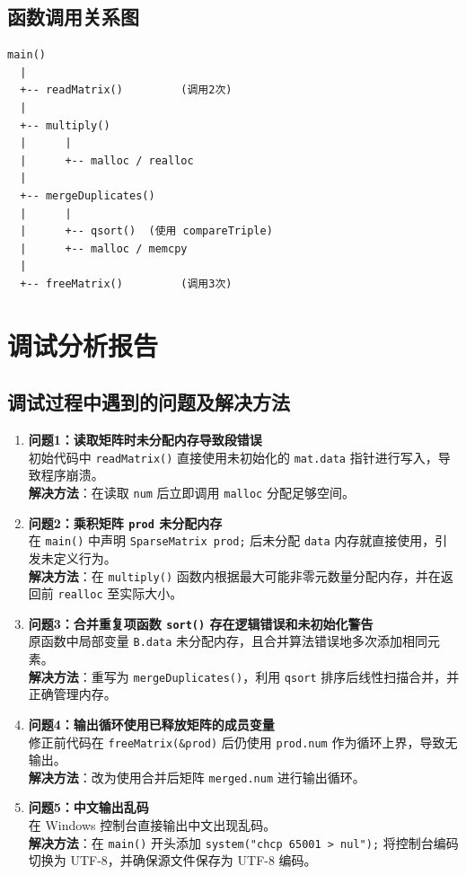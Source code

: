 \documentclass[UTF8]{ctexart}
\begin{document}
\subsection{函数调用关系图}
\begin{verbatim}
main()
  |
  +-- readMatrix()         (调用2次)
  |
  +-- multiply()
  |      |
  |      +-- malloc / realloc
  |
  +-- mergeDuplicates()
  |      |
  |      +-- qsort()  (使用 compareTriple)
  |      +-- malloc / memcpy
  |
  +-- freeMatrix()         (调用3次)
\end{verbatim}

\section{调试分析报告}

\subsection{调试过程中遇到的问题及解决方法}
\begin{enumerate}
    \item \textbf{问题1：读取矩阵时未分配内存导致段错误} \\
    初始代码中 \texttt{readMatrix()} 直接使用未初始化的 \texttt{mat.data} 指针进行写入，导致程序崩溃。\\
    \textbf{解决方法}：在读取 \texttt{num} 后立即调用 \texttt{malloc} 分配足够空间。

    \item \textbf{问题2：乘积矩阵 \texttt{prod} 未分配内存} \\
    在 \texttt{main()} 中声明 \texttt{SparseMatrix prod;} 后未分配 \texttt{data} 内存就直接使用，引发未定义行为。\\
    \textbf{解决方法}：在 \texttt{multiply()} 函数内根据最大可能非零元数量分配内存，并在返回前 \texttt{realloc} 至实际大小。

    \item \textbf{问题3：合并重复项函数 \texttt{sort()} 存在逻辑错误和未初始化警告} \\
    原函数中局部变量 \texttt{B.data} 未分配内存，且合并算法错误地多次添加相同元素。\\
    \textbf{解决方法}：重写为 \texttt{mergeDuplicates()}，利用 \texttt{qsort} 排序后线性扫描合并，并正确管理内存。

    \item \textbf{问题4：输出循环使用已释放矩阵的成员变量} \\
    修正前代码在 \texttt{freeMatrix(\&prod)} 后仍使用 \texttt{prod.num} 作为循环上界，导致无输出。\\
    \textbf{解决方法}：改为使用合并后矩阵 \texttt{merged.num} 进行输出循环。

    \item \textbf{问题5：中文输出乱码} \\
    在 Windows 控制台直接输出中文出现乱码。\\
    \textbf{解决方法}：在 \texttt{main()} 开头添加 \texttt{system("chcp 65001 > nul");} 将控制台编码切换为 UTF-8，并确保源文件保存为 UTF-8 编码。
\end{enumerate}
\end{document}
